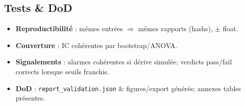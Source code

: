 \subsection{Tests \& DoD}
\begin{itemize}[nosep]
\item \textbf{Reproductibilité} : mêmes entrées $\Rightarrow$ mêmes rapports (hashs), $\pm$ float.
\item \textbf{Couverture} : IC cohérentes par bootstrap/ANOVA.
\item \textbf{Signalements} : alarmes cohérentes si dérive simulée; verdicts pass/fail corrects lorsque seuils franchis.
\item \textbf{DoD} : \texttt{report\_validation.json} \& figures/export générés; annexes tables présentes.
\end{itemize}
